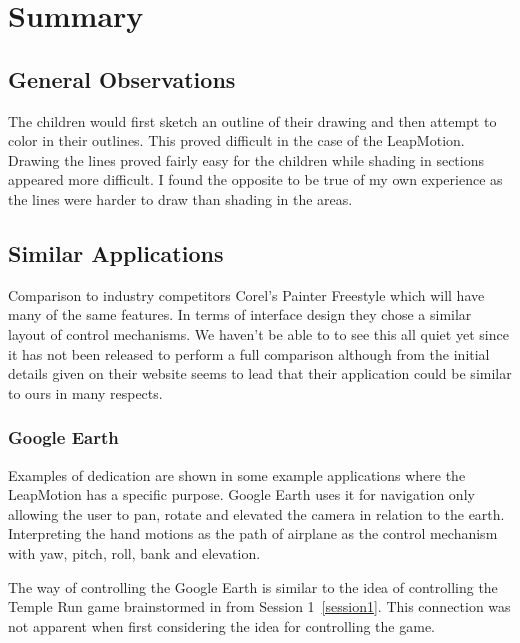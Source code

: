 
\chapter{Summary} %

\label{Chapter5} %



\section{General Observations}
The children would first sketch an outline of their drawing and then attempt to color in their outlines. This proved difficult in the case of the LeapMotion. Drawing the lines proved fairly easy for the children while shading in sections appeared more difficult. I found the opposite to be true of my own experience as the lines were harder to draw than shading in the areas.

\section{Similar Applications}

Comparison to industry competitors Corel's Painter Freestyle which will have many of the same features. In terms of interface design they chose a similar layout of control mechanisms. We haven't be able to to see this all quiet yet since it has not been released to perform a full comparison although from the initial details given on their website seems to lead that their application could be similar to ours in many respects. \cite{corelfreestyle}

\subsection{Google Earth}
Examples of dedication are shown in some example applications where the LeapMotion has a specific purpose. Google Earth uses it for navigation only allowing the user to pan, rotate and elevated the camera in relation to the earth. Interpreting the hand motions as the path of airplane as the control mechanism with yaw, pitch, roll, bank and elevation. 

The way of controlling the Google Earth is similar to the idea of controlling the Temple Run game brainstormed in from Session 1~\ref{session1}. This connection was not apparent when first considering the idea for controlling the game. 

